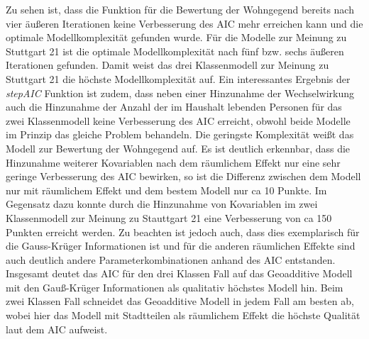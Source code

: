 \documentclass{Vorlage}
\begin{document}
Zu sehen ist, dass die Funktion für die Bewertung der Wohngegend bereits nach vier äußeren Iterationen keine Verbesserung des AIC mehr erreichen kann und die optimale Modellkomplexität gefunden wurde. Für die Modelle zur Meinung zu Stuttgart 21 ist die optimale Modellkomplexität nach fünf bzw. sechs äußeren Iterationen gefunden. Damit weist das drei Klassenmodell zur Meinung zu Stuttgart 21 die höchste Modellkomplexität auf. Ein interessantes Ergebnis der \textit{stepAIC} Funktion ist zudem, dass neben einer Hinzunahme der Wechselwirkung auch die Hinzunahme der Anzahl der im Haushalt lebenden Personen für das zwei Klassenmodell keine Verbesserung des AIC erreicht, obwohl beide Modelle im Prinzip das gleiche Problem behandeln. Die geringste Komplexität weißt das Modell zur Bewertung der Wohngegend auf. Es ist deutlich erkennbar, dass die Hinzunahme weiterer Kovariablen nach dem räumlichem Effekt nur eine sehr geringe Verbesserung des AIC bewirken, so ist die Differenz zwischen dem Modell nur mit räumlichem Effekt und dem bestem Modell nur ca 10 Punkte. Im Gegensatz dazu konnte durch die Hinzunahme von Kovariablen im zwei Klassenmodell zur Meinung zu Stauttgart 21 eine Verbesserung von ca 150 Punkten erreicht werden. Zu beachten ist jedoch auch, dass dies exemplarisch für die Gauss-Krüger Informationen ist und für die anderen räumlichen Effekte sind auch deutlich andere Parameterkombinationen anhand des AIC entstanden.
Insgesamt deutet das AIC für den drei Klassen Fall auf das Geoadditive Modell mit den Gauß-Krüger Informationen als qualitativ höchstes Modell hin. Beim zwei Klassen Fall schneidet das Geoadditive Modell in jedem Fall am besten ab, wobei hier das Modell mit Stadtteilen als räumlichem Effekt die höchste Qualität laut dem AIC aufweist.
\end{document}
